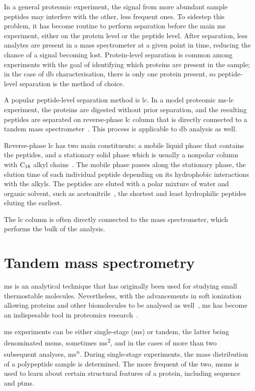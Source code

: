 In a general proteomic experiment, the signal from more abundant sample peptides may interfere with the other, less frequent ones. To sidestep this problem, it has become routine to perform separation before the main \gls*{ms} experiment, either on the protein level or the peptide level. After separation, less analytes are present in a mass spectrometer at a given point in time, reducing the chance of a signal becoming lost. Protein-level separation is common among experiments with the goal of identifying which proteins are present in the sample; in the case of \gls*{db} characterisation, there is only one protein present, so peptide-level separation is the method of choice.

A popular peptide-level separation method is \gls*{lc}. In a model proteomic \gls*{ms}-\gls*{lc} experiment, the proteins are digested without prior separation, and the resulting peptides are separated on reverse-phase \gls*{lc} column that is directly connected to a tandem mass spectrometer~\cite{washburn2001large}. This process is applicable to \gls*{db} analysis as well.

Reverse-phase \gls*{lc} has two main constituents: a mobile liquid phase that contains the peptides, and a stationary solid phase which is usually a nonpolar column with \(\ce{C18}\) alkyl chains~\cite{chang1976high}. The mobile phase passes along the stationary phase, the elution time of each individual peptide depending on its hydrophobic interactions with the alkyls. The peptides are eluted with a polar mixture of water and organic solvent, such as acetonitrile~\cite{frohlich2006proteome}, the shortest and least hydrophilic peptides eluting the earliest.

The \gls*{lc} column is often directly connected to the mass spectrometer, which performs the bulk of the analysis.


\section{Tandem mass spectrometry}\label{sec:msms}

\Gls*{ms} is an analytical technique that has originally been used for studying small thermostable molecules. Nevertheless, with the advancements in soft ionization allowing proteins and other biomolecules to be analysed as well~\cite{fenn1989electrospray}, \gls*{ms} has become an indispesable tool in proteomics research~\cite{collins2003human}.

\Gls*{ms} experiments can be either single-stage (\gls*{ms}) or tandem, the latter being denominated \gls*{msms}, sometimes \gls*{ms}\textsuperscript{2}, and in the cases of more than two subsequent analyses, \gls*{ms}\textsuperscript{\(n\)}. During single-stage experiments, the mass distribution of a polypeptide sample is determined. The more frequent of the two, \gls*{msms} is used to learn about certain structural features of a protein, including sequence and \glspl*{ptm}.~\cite{domon2006mass}


